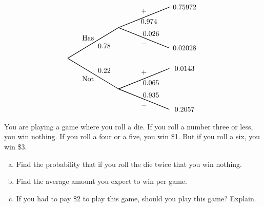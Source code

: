 \documentclass[11pt,letterpaper]{article}
\begin{document}
		\[
		\begin{tikzpicture}[scale= 1.0]
		\def\FirstUpLabel{Has}
		\def\FirstDownLabel{Not}
		\def\SecondUpLabel{$+$}
		\def\SecondDownLabel{$-$}
		\def\Up{$0.78$}
		\def\Down{$0.22$}
		\def\UpUp{$0.974$}
		\def\UpDown{$0.026$}
		\def\DownUp{$0.065$}
		\def\DownDown{$0.935$}
		\def\first{$0.75972$}
		\def\second{$0.02028$}
		\def\third{$0.0143$}
		\def\fourth{$0.2057$}
		
		\node at (1,1) {\FirstUpLabel};	
		\node at (1,-1) {\FirstDownLabel};	
		\node at (1.8,0.6) {\Up};
		\node at (1.8,-0.6) {\Down};
		\draw[thick] (0,0) -- (2.5,1.5);
		\draw[thick] (0,0) -- (2.5,-1.5);
		
		\node at (3.75,2.3) {\SecondUpLabel};
		\node at (3.75,0.7) {\SecondDownLabel};
		\node at (4,1.8) {\UpUp};
		\node at (4.1,1.2) {\UpDown};
		\node at (5.75,2.5) {\first};
		\node at (5.75,0.5) {\second};
		\draw[thick] (2.5,1.5) -- (5,2.5);
		\draw[thick] (2.5,1.5) -- (5,0.5);

		\node at (3.75,-0.7) {\SecondUpLabel};
		\node at (3.75,-2.3) {\SecondDownLabel};
		\node at (4.1,-1.2) {\DownUp};
		\node at (4.1,-1.8) {\DownDown};
		\node at (5.75,-0.5) {\third};	
		\node at (5.75,-2.5) {\fourth};	
		\draw[thick] (2.5,-1.5) -- (5,-0.5);
		\draw[thick] (2.5,-1.5) -- (5,-2.5);
		\end{tikzpicture}
		\]



\newpage



 You are playing a game where you roll a die. If you roll a number three or less, you win nothing. If you roll a four or a five, you win \$1. But if you roll a six, you win \$3. 
	\begin{enumerate}[(a)]
	\item Find the probability that if you roll the die twice that you win nothing.
	\item Find the average amount you expect to win per game.
	\item If you had to pay \$2 to play this game, should you play this game? Explain. 
	\end{enumerate} \pspace
\end{document}

